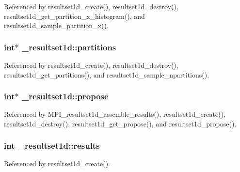 Referenced by resultset1d\+\_\+create(), resultset1d\+\_\+destroy(), resultset1d\+\_\+get\+\_\+partition\+\_\+x\+\_\+histogram(), and resultset1d\+\_\+sample\+\_\+partition\+\_\+x().

\subsubsection[{\texorpdfstring{partitions}{partitions}}]{\setlength{\rightskip}{0pt plus 5cm}int$\ast$ \+\_\+resultset1d\+::partitions}\hypertarget{struct__resultset1d_a7bf37aed611a2403ab477c953f9618b2}{}\label{struct__resultset1d_a7bf37aed611a2403ab477c953f9618b2}


Referenced by resultset1d\+\_\+create(), resultset1d\+\_\+destroy(), resultset1d\+\_\+get\+\_\+partitions(), and resultset1d\+\_\+sample\+\_\+npartitions().

\subsubsection[{\texorpdfstring{propose}{propose}}]{\setlength{\rightskip}{0pt plus 5cm}int$\ast$ \+\_\+resultset1d\+::propose}\hypertarget{struct__resultset1d_af58932e494062579242e74f66f82e449}{}\label{struct__resultset1d_af58932e494062579242e74f66f82e449}


Referenced by M\+P\+I\+\_\+resultset1d\+\_\+assemble\+\_\+results(), resultset1d\+\_\+create(), resultset1d\+\_\+destroy(), resultset1d\+\_\+get\+\_\+propose(), and resultset1d\+\_\+propose().

\subsubsection[{\texorpdfstring{results}{results}}]{\setlength{\rightskip}{0pt plus 5cm}int \+\_\+resultset1d\+::results}\hypertarget{struct__resultset1d_a410df825b9364f14da01022c7cb6c920}{}\label{struct__resultset1d_a410df825b9364f14da01022c7cb6c920}


Referenced by resultset1d\+\_\+create().

